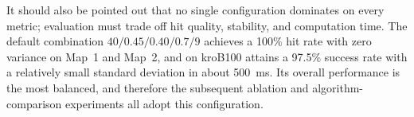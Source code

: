 It should also be pointed out that no single configuration dominates on every metric; evaluation must trade off hit quality, stability, and computation time. The default combination $40/0.45/0.40/0.7/9$ achieves a 100\% hit rate with zero variance on Map~1 and Map~2, and on kroB100 attains a 97.5\% success rate with a relatively small standard deviation in about 500~ms. Its overall performance is the most balanced, and therefore the subsequent ablation and algorithm-comparison experiments all adopt this configuration.
